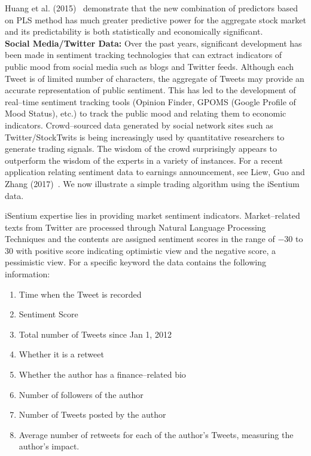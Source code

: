 Huang et al. (2015)~\cite{huang} demonstrate that the new combination of predictors based on PLS method has much greater predictive power for the aggregate stock market and its predictability is both statistically and economically significant. \\


\noindent \textbf{Social Media/Twitter Data:} Over the past years, significant development has been made in sentiment tracking technologies that can extract indicators of public mood from social media such as blogs and Twitter feeds. Although each Tweet is of limited number of characters, the aggregate of Tweets may provide an accurate representation of public sentiment. This has led to the development of real--time sentiment tracking tools (Opinion Finder, GPOMS (Google Profile of Mood Status), etc.) to track the public mood and relating them to economic indicators. Crowd--sourced data generated by social network sites such as Twitter/StockTwits is being increasingly used by quantitative researchers to generate trading signals. The wisdom of the crowd surprisingly appears to outperform the wisdom of the experts in a variety of instances. For a recent application relating sentiment data to earnings announcement, see Liew, Guo and Zhang (2017)~\cite{liewzhang}. We now illustrate a simple trading algorithm using the iSentium data.


iSentium expertise lies in providing market sentiment indicators. Market--related texts from Twitter are processed through Natural Language Processing Techniques and the contents are assigned sentiment scores in the range of $-30$ to $30$ with positive score indicating optimistic view and the negative score, a pessimistic view. For a specific keyword the data contains the following information: \\

\begin{enumerate}[--]
\item Time when the Tweet is recorded
\item Sentiment Score
\item Total number of Tweets since Jan 1, 2012
\item Whether it is a retweet
\item Whether the author has a finance--related bio
\item Number of followers of the author
\item Number of Tweets posted by the author
\item Average number of retweets for each of the author's Tweets, measuring the author's impact. \\
\end{enumerate}


